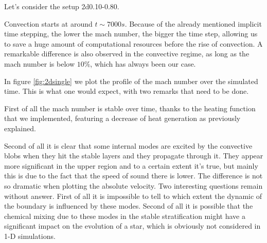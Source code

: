 Let's consider the setup 2d0.10-0.80. 

Convection starts at around $t \sim 7000 s$. Because of the already mentioned implicit time stepping, the lower the mach number, the bigger the time step, allowing us to save a huge amount of computational resources before the rise of convection. A remarkable difference is also observed in the convective regime, as long as the mach number is below $10 \%$, which has always been our case.

In figure \ref{fig:2dsingle} we plot the profile of the mach number over the simulated time. This is what one would expect, with two remarks that need to be done. 

First of all the mach number is stable over time, thanks to the heating function that we implemented, featuring a decrease of heat generation as previously explained. 

Second of all it is clear that some internal modes are excited by the convective blobs when they hit the stable layers and they propagate through it. They appear more significant in the upper region and to a certain extent it's true, but mainly this is due to the fact that the speed of sound there is lower. The difference is not so dramatic when plotting the absolute velocity. Two interesting questions remain without answer. First of all it is impossible to tell to which extent the dynamic of the boundary is influenced by these modes. Second of all it is possible that the chemical mixing due to these modes in the stable stratification might have a significant impact on the evolution of a star, which is obviously not considered in 1-D simulations.

